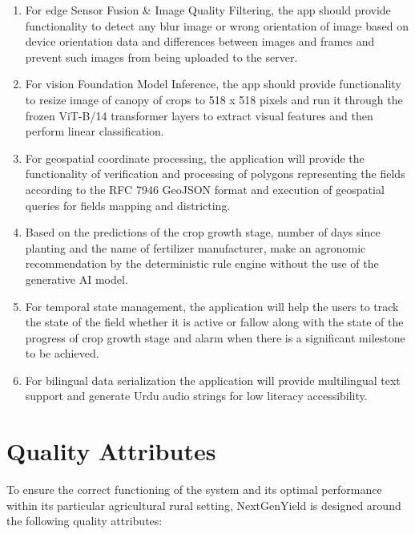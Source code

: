 \documentclass{FastFyp}
\begin{document}
\begin{enumerate}
    \item For edge Sensor Fusion \& Image Quality Filtering, the app should provide functionality to detect any blur image or wrong orientation of image based on device orientation data and differences between images and frames and prevent such images from being uploaded to the server.
    \item For vision Foundation Model Inference, the app should provide functionality to resize image of canopy of crops to 518 x 518 pixels and run it through the frozen ViT-B/14 transformer layers to extract visual features and then perform linear classification.
    \item For geospatial coordinate processing, the application will provide the functionality of verification and processing of polygons representing the fields according to the RFC 7946 GeoJSON format and execution of geospatial queries for fields mapping and districting.
    \item Based on the predictions of the crop growth stage, number of days since planting and the name of fertilizer manufacturer, make an agronomic recommendation by the deterministic rule engine without the use of the generative AI model.
    \item For temporal state management, the application will help the users to track the state of the field whether it is active or fallow along with the state of the progress of crop growth stage and alarm when there is a significant milestone to be achieved.
    \item For bilingual data serialization the application will provide multilingual text support and generate Urdu audio strings for low literacy accessibility.
\end{enumerate}

 

\section{Quality Attributes}
To ensure the correct functioning of the system and its optimal performance
within its particular agricultural rural setting, NextGenYield is designed
around the following quality attributes:
\end{document}
